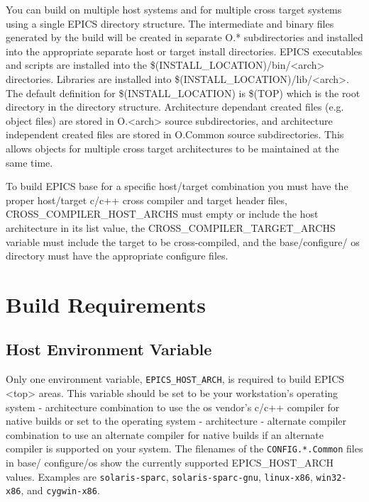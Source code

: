 You can build on multiple host systems and for multiple cross target systems using a single EPICS directory structure. 
The intermediate and binary files generated by the build will be created in separate O.* subdirectories and installed into 
the appropriate separate host or target install directories. EPICS executables and scripts are installed into the 
\$(INSTALL\_LOCATION)/bin/\textless{}arch\textgreater{} directories. Libraries are installed into \$(INSTALL\_LOCATION)/lib/\textless{}arch\textgreater{}. The 
default definition for \$(INSTALL\_LOCATION) is \$(TOP) which is the root directory in the directory structure. 
Architecture dependant created files (e.g. object files) are stored in O.\textless{}arch\textgreater{} source subdirectories, and architecture 
independent created files are stored in O.Common source subdirectories. This allows objects for multiple cross target 
architectures to be maintained at the same time. 

To build EPICS base for a specific host/target combination you must have the proper host/target c/c++ cross compiler and 
target header files, CROSS\_COMPILER\_HOST\_ARCHS must empty or include the host architecture in its list value, the 
CROSS\_COMPILER\_TARGET\_ARCHS variable must include the target to be cross-compiled, and the base/configure/
os directory must have the appropriate configure files.

\section{Build Requirements}

\subsection{Host Environment Variable}

Only one environment variable, \verb|EPICS_HOST_ARCH|, is required to build EPICS \textless{}top\textgreater{} areas. This variable should be 
set to be your workstation's operating system - architecture combination to use the os vendor's c/c++ compiler for native 
builds or set to the operating system - architecture - alternate compiler combination to use an alternate compiler for native 
builds if an alternate compiler is supported on your system. The filenames of the \verb|CONFIG.*.Common| files in base/
configure/os show the currently supported EPICS\_HOST\_ARCH values. Examples are \verb|solaris-sparc|, \verb|solaris-sparc-gnu|, \verb|linux-x86|, \verb|win32-x86|, and \verb|cygwin-x86|. 

